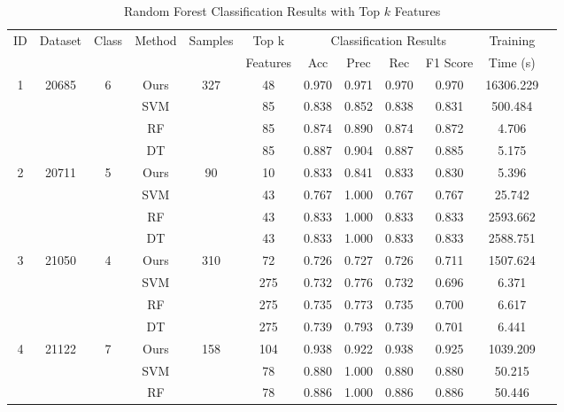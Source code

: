 


\begin{table}[htbp]
  \centering
  \caption{Random Forest Classification Results with Top $k$ Features}
  \label{tab:RF_results}
  \scriptsize
  \begin{tabular}{cccccccccccc}
    \toprule
    ID & Dataset & Class & Method & Samples & \multicolumn{1}{c}{Top k} & \multicolumn{4}{c}{Classification Results} & {Training} \\
    \cmidrule(lr){7-10} 
        &         &       &         &   & Features & Acc & Prec & Rec & F1 Score & Time (s)  \\
  \midrule
        1  & 20685 & 6 & Ours & 327 & 48 & 0.970 & 0.971 & 0.970 & 0.970 & 16306.229 \\
           &       &   & SVM  &     & 85  & 0.838 & 0.852 & 0.838 & 0.831 & 500.484 \\
           &       &   & RF   &     & 85  & 0.874 & 0.890 & 0.874 & 0.872 & 4.706 \\
           &       &   & DT   &     & 85  & 0.887 & 0.904 & 0.887 & 0.885 & 5.175 \\
        \midrule
        2  & 20711 & 5 & Ours & 90  & 10  & 0.833 & 0.841 & 0.833 & 0.830 & 5.396 \\
           &       &   & SVM  &     & 43  & 0.767 & 1.000 & 0.767 & 0.767 & 25.742 \\
           &       &   & RF   &     & 43  & 0.833 & 1.000 & 0.833 & 0.833 & 2593.662 \\
           &       &   & DT   &     & 43  & 0.833 & 1.000 & 0.833 & 0.833 & 2588.751 \\
        \midrule
        3  & 21050 & 4 & Ours & 310 & 72  & 0.726 & 0.727 & 0.726 & 0.711 & 1507.624 \\
           &       &   & SVM  &     & 275 & 0.732 & 0.776 & 0.732 & 0.696 & 6.371 \\
           &       &   & RF   &     & 275 & 0.735 & 0.773 & 0.735 & 0.700 & 6.617 \\
           &       &   & DT   &     & 275 & 0.739 & 0.793 & 0.739 & 0.701 & 6.441 \\
        \midrule
        4  & 21122 & 7 & Ours & 158 & 104 & 0.938 & 0.922 & 0.938 & 0.925 & 1039.209 \\
           &       &   & SVM  &     & 78  & 0.880 & 1.000 & 0.880 & 0.880 & 50.215 \\
           &       &   & RF   &     & 78  & 0.886 & 1.000 & 0.886 & 0.886 & 50.446 \\

\end{tabular}
\end{table}
